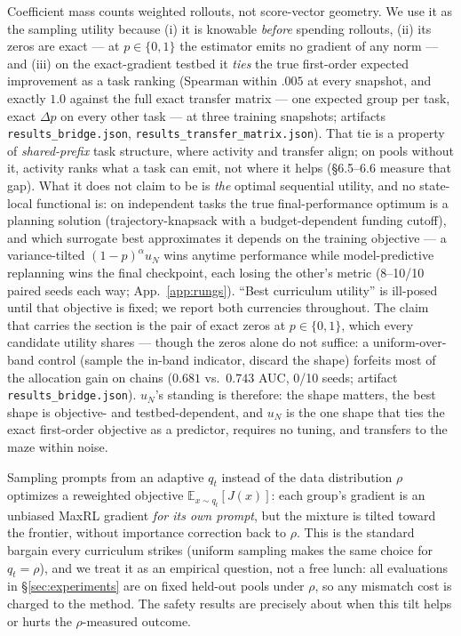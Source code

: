 \begin{remark}\label{rem:scope}
Coefficient mass counts weighted rollouts, not score-vector geometry. We
use it as the sampling utility because (i) it is knowable \emph{before}
spending rollouts, (ii) its zeros are exact --- at $p\in\{0,1\}$ the
estimator emits no gradient of any norm --- and (iii) on the
exact-gradient testbed it \emph{ties} the true first-order expected
improvement as a task ranking (Spearman within $.005$ at every
snapshot, and exactly $1.0$ against the full exact transfer matrix ---
one expected group per task, exact $\Delta p$ on every other task ---
at three training snapshots; artifacts \texttt{results\_bridge.json},
\texttt{results\_transfer\_matrix.json}). That tie is a property of
\emph{shared-prefix} task structure, where activity and transfer
align; on pools without it, activity ranks what a task can emit, not
where it helps (\S 6.5--6.6 measure that gap). What it does not
claim to be is \emph{the} optimal sequential utility, and no
state-local functional is: on independent tasks the true
final-performance optimum is a planning solution (trajectory-knapsack
with a budget-dependent funding cutoff), and which surrogate best
approximates it depends on the training objective --- a
variance-tilted $(1{-}p)^\alpha u_N$ wins anytime performance while
model-predictive replanning wins the final checkpoint, each losing the
other's metric (8--10/10 paired seeds each way; App.~\ref{app:rungs}).
``Best curriculum utility'' is ill-posed until that objective is
fixed; we report both currencies throughout. The claim that carries the section
is the pair of exact zeros at $p\in\{0,1\}$, which every candidate
utility shares --- though the zeros alone do not suffice: a
uniform-over-band control (sample the in-band indicator, discard the
shape) forfeits most of the allocation gain on chains ($0.681$ vs.\
$0.743$ AUC, 0/10 seeds; artifact \texttt{results\_bridge.json}).
$u_N$'s standing is therefore: the shape matters, the best shape is
objective- and testbed-dependent, and $u_N$ is the one shape that
ties the exact first-order objective as a predictor, requires no
tuning, and transfers to the maze within noise.
\end{remark}

\begin{remark}
\label{rem:objective}
Sampling prompts from an adaptive $q_t$ instead of the data
distribution $\rho$ optimizes a reweighted objective
$\mathbb{E}_{x\sim q_t}[J(x)]$: each group's gradient is an unbiased
MaxRL gradient \emph{for its own prompt}, but the mixture is tilted
toward the frontier, without importance correction back to $\rho$.
This is the standard bargain every curriculum strikes (uniform
sampling makes the same choice for $q_t{=}\rho$), and we treat it as
an empirical question, not a free lunch: all evaluations in
\S\ref{sec:experiments} are on fixed held-out pools under $\rho$, so
any mismatch cost is charged to the method. The safety results are
precisely about when this tilt helps or hurts the $\rho$-measured
outcome.
\end{remark}

